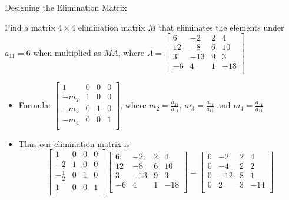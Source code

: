 \documentclass[10pt]{beamer}
\begin{document}
\begin{frame}{Designing the Elimination Matrix}
\begin{example}
    
    Find a matrix $4\times 4$ elimination matrix $M$ that eliminates the elements under $a_{11}=6$ when multiplied as $MA$, where
    $A = \begin{bmatrix}
    6 & -2 & 2 & 4\\
    12 & -8 & 6 & 10\\
    3 & -13 & 9 & 3\\
    -6 & 4 & 1 & -18\\
    \end{bmatrix}$
\end{example}
\begin{itemize}

    \item Formula:  
    $\begin{bmatrix}
    1 & 0 & 0 & 0\\
    -m_2 & 1 & 0 & 0\\
    -m_3 & 0 & 1 & 0\\
    -m_4 & 0 & 0 & 1\\
    \end{bmatrix}$, where $m_2= \frac{a_{21}}{a_{11}}$, $m_3=\frac{a_{31}}{a_{11}}$ and $m_4=\frac{a_{41}}{a_{11}}$
    \item Thus our elimination matrix is 
    $$
    \begin{bmatrix}
    1 & 0 & 0 & 0\\
    -2 & 1 & 0 & 0\\
    -\frac{1}{2} & 0 & 1 & 0\\
    1 & 0 & 0 & 1\\
    \end{bmatrix}
    \begin{bmatrix}
    \boxed{6} & -2 & 2 & 4\\
    12 & -8 & 6 & 10\\
    3 & -13 & 9 & 3\\
    -6 & 4 & 1 & -18\\
    \end{bmatrix} = 
    \begin{bmatrix}
    6 & -2 & 2 & 4\\
    0 & -4 & 2 & 2\\
    0 & -12 & 8 & 1\\
    0 & 2 & 3 & -14\\
    \end{bmatrix}
    $$
\end{itemize}
\end{frame}
\end{document}
